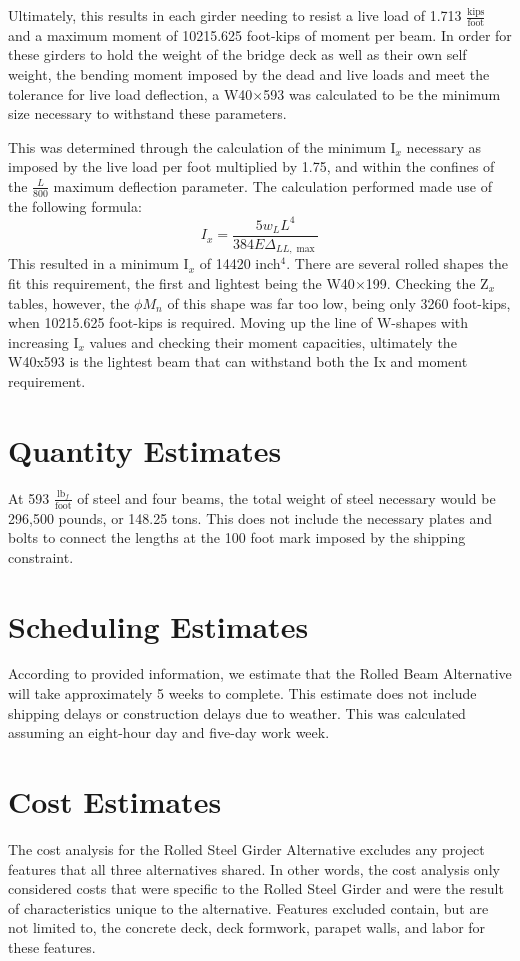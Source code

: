 Ultimately, this results in each girder needing to resist a live load of 1.713 \(\frac{\textrm{kips}}{\textrm{foot}}\) and a maximum moment of 10215.625 foot-kips of moment per beam. In order for these girders to hold the weight of the bridge deck as well as their own self weight, the bending moment imposed by the dead and live loads and meet the tolerance for live load deflection, a W40\(\times\)593 was calculated to be the minimum size necessary to withstand these parameters.

This was determined through the calculation of the minimum I\(_{x}\) necessary as imposed by the live load per foot multiplied by 1.75, and within the confines of the \(\frac{L}{800}\) maximum deflection parameter.  The calculation performed made use of the following formula:
\begin{equation*}
I_{x}=\dfrac{5w_{L}L^{4}}{384E\Delta_{LL,\max}}
\end{equation*}
This resulted in a minimum I\(_{x}\) of 14420 inch\(^{4}\).  There are several rolled shapes the fit this requirement, the first and lightest being the W40\(\times\)199.  Checking the  Z\(_{x}\) tables, however, the $\phi M_{n}$ of this shape was far too low, being only 3260 foot-kips, when 10215.625 foot-kips is required. Moving up the line of W-shapes with increasing I$_{x}$ values and checking their moment capacities, ultimately the W40x593 is the lightest beam that can withstand both the Ix and moment requirement.

\section{Quantity Estimates}
At 593 $\frac{\textrm{lb}_{f}}{\textrm{foot}}$ of steel and four beams, the total weight of steel necessary would be 296,500 pounds, or 148.25 tons. This does not include the necessary plates and bolts to connect the lengths at the 100 foot mark imposed by the shipping constraint.


\section{Scheduling Estimates}
According to provided information, we estimate that the Rolled Beam Alternative will take approximately 5 weeks to complete. This estimate does not include shipping delays or construction delays due to weather. This was calculated assuming an eight-hour day and five-day work week.

\section{Cost Estimates}
The cost analysis for the Rolled Steel Girder Alternative excludes any project features that all three alternatives shared. In other words, the cost analysis only considered costs that were specific to the Rolled Steel Girder and were the result of characteristics unique to the alternative. Features excluded contain, but are not limited to, the concrete deck, deck formwork, parapet walls, and labor for these features.

